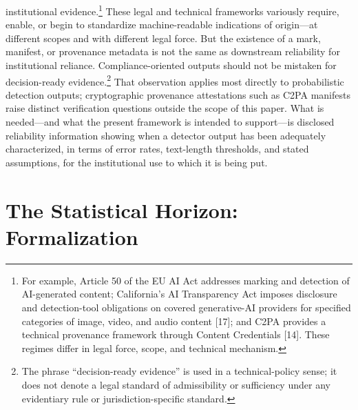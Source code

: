 \documentclass[11pt]{article}
\begin{document}
institutional evidence.\footnote{For example, Article 50 of the EU AI Act
addresses marking and detection of AI-generated content; California's AI
Transparency Act imposes disclosure and detection-tool obligations on covered
generative-AI providers for specified categories of image, video, and audio
content [17]; and C2PA provides a technical provenance framework through Content
Credentials [14]. These regimes differ in legal force, scope, and technical
mechanism.} These legal and technical frameworks variously require, enable, or
begin to standardize machine-readable indications of origin---at different scopes
and with different legal force. But the existence of a mark, manifest, or
provenance metadata is not the same as downstream reliability for institutional
reliance. Compliance-oriented outputs should not be mistaken for decision-ready
evidence.\footnote{The phrase ``decision-ready evidence'' is used in a
technical-policy sense; it does not denote a legal standard of admissibility or
sufficiency under any evidentiary rule or jurisdiction-specific standard.} That
observation applies most directly to probabilistic detection outputs;
cryptographic provenance attestations such as C2PA manifests raise distinct
verification questions outside the scope of this paper. What is needed---and what
the present framework is intended to support---is disclosed reliability
information showing when a detector output has been adequately characterized, in
terms of error rates, text-length thresholds, and stated assumptions, for the
institutional use to which it is being put.
\section{The Statistical Horizon: Formalization}
\end{document}
